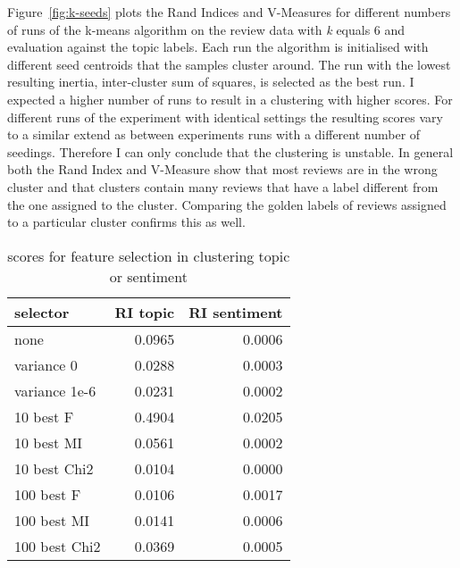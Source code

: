 \documentclass[11pt]{article}
\begin{document}
Figure~\ref{fig:k-seeds} plots the Rand Indices and V-Measures for different numbers of runs of the k-means algorithm on the review data with \emph{k} equals 6 and evaluation against the topic labels. Each run the algorithm is initialised with different seed centroids that the samples cluster around. The run with the lowest resulting inertia, inter-cluster sum of squares, is selected as the best run. I expected a higher number of runs to result in a clustering with higher scores. For different runs of the experiment with identical settings the resulting scores vary to a similar extend as between experiments runs with a different number of seedings. Therefore I can only conclude that the clustering is unstable. In general both the Rand Index and V-Measure show that most reviews are in the wrong cluster and that clusters contain many reviews that have a label different from the one assigned to the cluster. Comparing the golden labels of reviews assigned to a particular cluster confirms this as well.

\begin{table}[ht]\footnotesize
\centering
\caption{scores for feature selection in clustering topic or sentiment}
\label{tab:clust-select}
\begin{tabular}{ l r r }
selector & RI topic & RI sentiment \\
\hline
none           & 0.0965 & 0.0006 \\
variance 0     & 0.0288 & 0.0003 \\
variance 1e-6  & 0.0231 & 0.0002 \\
10  best F     & 0.4904 & 0.0205 \\
10  best MI    & 0.0561 & 0.0002 \\
10  best Chi2  & 0.0104 & 0.0000 \\
100 best F     & 0.0106 & 0.0017 \\
100 best MI    & 0.0141 & 0.0006 \\
100 best Chi2  & 0.0369 & 0.0005 \\
\end{tabular}
\end{table}
\end{document}
